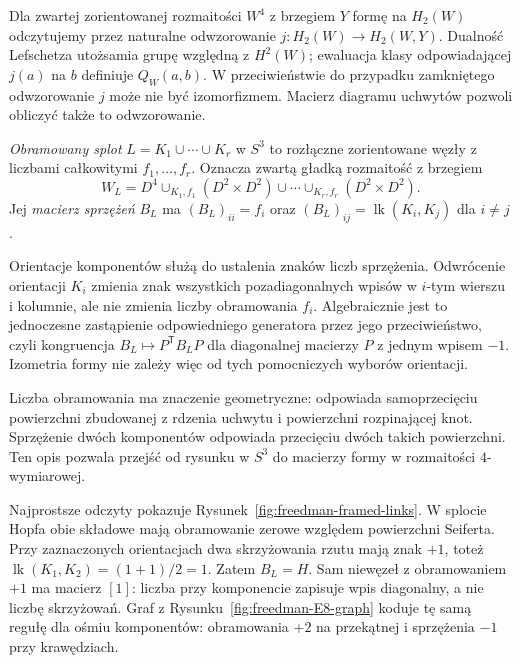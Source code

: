 Dla zwartej zorientowanej rozmaitości $W^4$ z brzegiem
$Y$ formę na $H_2(W)$ odczytujemy przez naturalne
odwzorowanie $j:H_2(W)\to H_2(W,Y)$.
Dualność Lefschetza utożsamia grupę względną z $H^2(W)$;
ewaluacja klasy odpowiadającej $j(a)$ na $b$ definiuje
$Q_W(a,b)$. W przeciwieństwie do przypadku zamkniętego
odwzorowanie $j$ może nie być izomorfizmem. Macierz
diagramu uchwytów pozwoli obliczyć także to odwzorowanie.

\begin{definicja}
\label{def:freedman-framed-link}
\emph{Obramowany splot} $L=K_1\cup\cdots\cup K_r$
w $S^3$ to rozłączne zorientowane węzły z liczbami
całkowitymi $f_1,\ldots,f_r$. Oznacza zwartą gładką
rozmaitość z brzegiem
\[
 W_L=D^4\cup_{K_1,f_1}(D^2\times D^2)
       \cup\cdots\cup_{K_r,f_r}(D^2\times D^2).
\]
Jej \emph{macierz sprzężeń} $B_L$ ma
$(B_L)_{ii}=f_i$ oraz
$(B_L)_{ij}=\operatorname{lk}(K_i,K_j)$ dla $i\ne j$.
\end{definicja}

Orientacje komponentów służą do ustalenia znaków
liczb sprzężenia. Odwrócenie orientacji $K_i$ zmienia
znak wszystkich pozadiagonalnych wpisów w $i$-tym
wierszu i kolumnie, ale nie zmienia liczby obramowania
$f_i$. Algebraicznie jest to jednoczesne zastąpienie
odpowiedniego generatora przez jego przeciwieństwo,
czyli kongruencja $B_L\mapsto P^{\mathsf T}B_LP$
dla diagonalnej macierzy $P$ z jednym wpisem $-1$.
Izometria formy nie zależy więc od tych pomocniczych
wyborów orientacji.

Liczba obramowania ma znaczenie geometryczne:
odpowiada samoprzecięciu powierzchni zbudowanej z rdzenia
uchwytu i powierzchni rozpinającej knot. Sprzężenie
dwóch komponentów odpowiada przecięciu dwóch takich
powierzchni. Ten opis pozwala przejść od rysunku w $S^3$
do macierzy formy w rozmaitości $4$-wymiarowej.

Najprostsze odczyty pokazuje Rysunek~\ref{fig:freedman-framed-links}.
W splocie Hopfa obie składowe mają obramowanie zerowe
względem powierzchni Seiferta. Przy zaznaczonych orientacjach
dwa skrzyżowania rzutu mają znak $+1$, toteż
$\operatorname{lk}(K_1,K_2)=(1+1)/2=1$. Zatem $B_L=H$.
Sam niewęzeł z obramowaniem $+1$ ma macierz $[1]$:
liczba przy komponencie zapisuje wpis diagonalny,
a nie liczbę skrzyżowań. Graf z
Rysunku~\ref{fig:freedman-E8-graph} koduje tę samą regułę
dla ośmiu komponentów: obramowania $+2$ na przekątnej
i sprzężenia $-1$ przy krawędziach.

